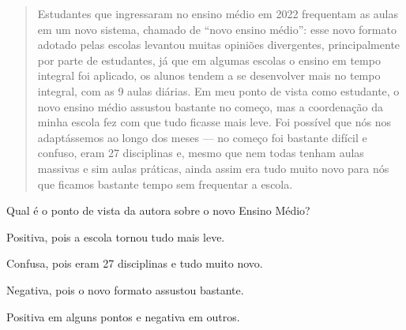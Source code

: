 \begin{quote}
\noindent Estudantes que ingressaram no ensino médio em 2022 frequentam as aulas
em um novo sistema, chamado de ``novo ensino médio'': esse novo formato
adotado pelas escolas levantou muitas opiniões divergentes,
principalmente por parte de estudantes, já que em algumas escolas o
ensino em tempo integral foi aplicado, os alunos tendem a se desenvolver
mais no tempo integral, com as 9 aulas diárias. Em meu ponto de vista
como estudante, o novo ensino médio assustou bastante no começo, mas a
coordenação da minha escola fez com que tudo ficasse mais leve. Foi
possível que nós nos adaptássemos ao longo dos meses — no começo foi
bastante difícil e confuso, eram 27 disciplinas e, mesmo que nem todas
tenham aulas massivas e sim aulas práticas, ainda assim era tudo muito
novo para nós que ficamos bastante tempo sem frequentar a escola.

\end{quote}

\noindent Qual é o ponto de vista da autora sobre o novo Ensino Médio?

\begin{escolha}
\item
  Positiva, pois a escola tornou tudo mais leve.
\item
  Confusa, pois eram 27 disciplinas e tudo muito novo.
\item
  Negativa, pois o novo formato assustou bastante.
\item
  Positiva em alguns pontos e negativa em outros.
\end{escolha}



